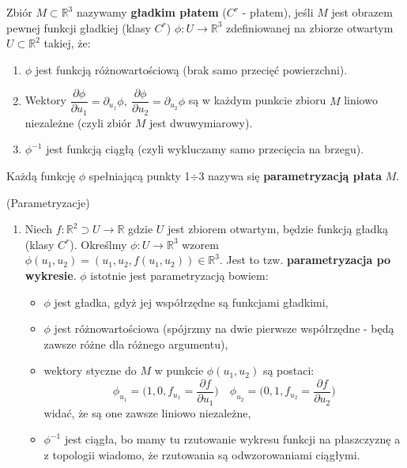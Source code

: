 \begin{df}
	Zbiór $M\subset\mathbb{R}^3$ nazywamy \textbf{gładkim płatem} ($C^r$ - płatem), jeśli $M$ jest obrazem pewnej funkcji gładkiej (klasy $C^r$) $\phi:U\rightarrow\mathbb{R}^3$ zdefiniowanej na zbiorze otwartym $U\subset\mathbb{R}^2$ takiej, że:
	\begin{enumerate}[\rm 1.]
		\item
		$\phi$ jest funkcją różnowartościową (brak samo przecięć powierzchni).
		\item
		Wektory $\dfrac{\partial \phi}{\partial u_1}=\partial_{u_1}\phi,\ \dfrac{\partial \phi}{\partial u_2}=\partial_{u_2}\phi$ są w każdym punkcie zbioru $M$ liniowo niezależne (czyli zbiór $M$ jest dwuwymiarowy).
		\item
		$\phi^{-1}$ jest funkcją ciągłą (czyli wykluczamy samo przecięcia na brzegu).
	\end{enumerate}
	Każdą funkcję $\phi$ spełniającą punkty 1$\div$3 nazywa się \textbf{parametryzacją płata} $M$.
\end{df}

\begin{przyk}{(Parametryzacje)}\\
	\begin{enumerate}[\rm 1.]
		\item
		Niech $f:\mathbb{R}^2\supset U\rightarrow\mathbb{R}$ gdzie $U$ jest zbiorem otwartym, będzie funkcją gładką (klasy $C^r$). Określmy $\phi:U\rightarrow\mathbb{R}^3$ wzorem $\phi(u_1,u_2)=(u_1,u_2,f(u_1,u_2))\in\mathbb{R}^3$. Jest to tzw. \textbf{parametryzacja po wykresie}. $\phi$ istotnie jest parametryzacją bowiem:
		\begin{itemize}
			\item
			$\phi$ jest gładka, gdyż jej współrzędne są funkcjami gładkimi,
			\item
			$\phi$ jest różnowartościowa (spójrzmy na dwie pierwsze współrzędne - będą zawsze różne dla różnego argumentu),
			\item
			wektory styczne do $M$ w punkcie $\phi(u_1,u_2)$ są postaci: $$\phi_{u_1}=\bigg(1,0,f_{u_1}=\dfrac{\partial f}{\partial u_1}\bigg)\quad \phi_{u_2}=\bigg(0,1,f_{u_2}=\dfrac{\partial f}{\partial u_2}\bigg)$$
			widać, że są one zawsze liniowo niezależne,
			\item
			$\phi^{-1}$ jest ciągła, bo mamy tu rzutowanie wykresu funkcji na płaszczyznę a z topologii wiadomo, że rzutowania są odwzorowaniami ciągłymi.
		\end{itemize}
	\end{enumerate}
\end{przyk}

